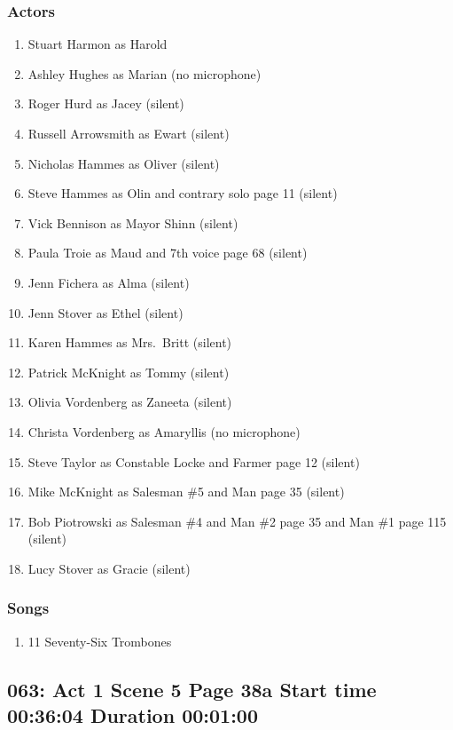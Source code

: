 \subsubsection{Actors}
\begin{enumerate}
\item Stuart Harmon as Harold
\item Ashley Hughes as Marian (no microphone)
\item Roger Hurd as Jacey (silent)
\item Russell Arrowsmith as Ewart (silent)
\item Nicholas Hammes as Oliver (silent)
\item Steve Hammes as Olin and contrary solo page 11 (silent)
\item Vick Bennison as Mayor Shinn (silent)
\item Paula Troie as Maud and 7th voice page 68 (silent)
\item Jenn Fichera as Alma (silent)
\item Jenn Stover as Ethel (silent)
\item Karen Hammes as Mrs.~Britt (silent)
\item Patrick McKnight as Tommy (silent)
\item Olivia Vordenberg as Zaneeta (silent)
\item Christa Vordenberg as Amaryllis (no microphone)
\item Steve Taylor as Constable Locke and Farmer page 12 (silent)
\item Mike McKnight as Salesman \#5 and Man page 35 (silent)
\item Bob Piotrowski as Salesman \#4 and Man \#2 page 35 and Man \#1 page 115 (silent)
\item Lucy Stover as Gracie (silent)
\end{enumerate}

\subsubsection{Songs}
\begin{enumerate}
\item 11 Seventy-Six Trombones
\end{enumerate}
\subsection{063: Act 1 Scene 5 Page 38a Start time 00:36:04 Duration 00:01:00}

